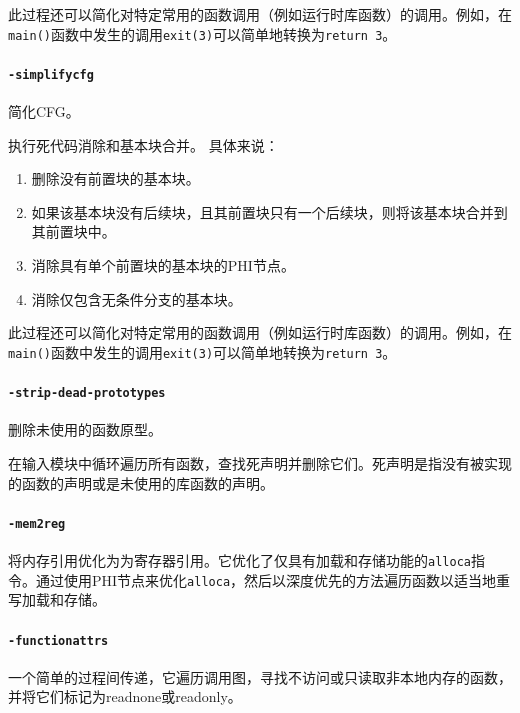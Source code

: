 \documentclass[lang=cn,11pt,a4paper,cite=authornum]{paper}
\begin{document}
此过程还可以简化对特定常用的函数调用（例如运行时库函数）的调用。例如，在\texttt{main()}函数中发生的调用\texttt{exit(3)}可以简单地转换为\texttt{return 3}。

\paragraph{\texttt{-simplifycfg}} 简化CFG。

执行死代码消除和基本块合并。 具体来说：

\begin{enumerate}
    \item 删除没有前置块的基本块。
    \item 如果该基本块没有后续块，且其前置块只有一个后续块，则将该基本块合并到其前置块中。
    \item 消除具有单个前置块的基本块的PHI节点。
    \item 消除仅包含无条件分支的基本块。
\end{enumerate}

此过程还可以简化对特定常用的函数调用（例如运行时库函数）的调用。例如，在\texttt{main()}函数中发生的调用\texttt{exit(3)}可以简单地转换为\texttt{return 3}。

\paragraph{\texttt{-strip-dead-prototypes}} 删除未使用的函数原型。

在输入模块中循环遍历所有函数，查找死声明并删除它们。死声明是指没有被实现的函数的声明或是未使用的库函数的声明。

\paragraph{\texttt{-mem2reg}}

将内存引用优化为为寄存器引用。它优化了仅具有加载和存储功能的\texttt{alloca}指令。通过使用PHI节点来优化\texttt{alloca}，然后以深度优先的方法遍历函数以适当地重写加载和存储。

\paragraph{\texttt{-functionattrs}}

一个简单的过程间传递，它遍历调用图，寻找不访问或只读取非本地内存的函数，并将它们标记为readnone或readonly。
\end{document}
